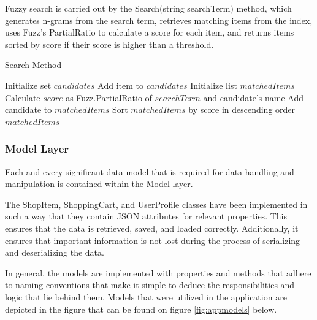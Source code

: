 Fuzzy search is carried out by the Search(string searchTerm) method, which generates n-grams from the search term, retrieves matching items from the index, uses Fuzz's PartialRatio to calculate a score for each item, and returns items sorted by score if their score is higher than a threshold.

\begin{algorithm}
	\caption{Search Method}
	\begin{algorithmic}
		\State Initialize set $candidates$
		\State Add item to $candidates$
		\EndFor
		\EndIf
		\EndFor
		\State Initialize list $matchedItems$
		\State Calculate $score$ as Fuzz.PartialRatio of $searchTerm$ and candidate's name
		\State Add candidate to $matchedItems$
		\EndIf
		\EndFor
		\State Sort $matchedItems$ by score in descending order
		\newline
		\Return $matchedItems$
	\end{algorithmic}
\end{algorithm}

\subsubsection{Model Layer}

Each and every significant data model that is required for data handling and manipulation is contained within the Model layer. 

The ShopItem, ShoppingCart, and UserProfile classes have been implemented in such a way that they contain JSON attributes for relevant properties. This ensures that the data is retrieved, saved, and loaded correctly. Additionally, it ensures that important information is not lost during the process of serializing and deserializing the data. 

In general, the models are implemented with properties and methods that adhere to naming conventions that make it simple to deduce the responsibilities and logic that lie behind them. Models that were utilized in the application are depicted in the figure that can be found on figure \ref{fig:appmodels} below.

